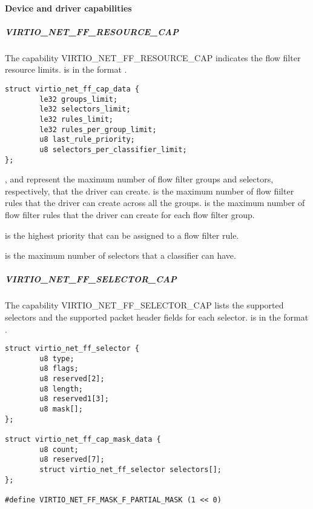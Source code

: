 \paragraph{Device and driver capabilities}
\label{par:Device Types / Network Device / Device Operation / Flow filter / Device and driver capabilities}

\subparagraph{VIRTIO_NET_FF_RESOURCE_CAP}
\label{par:Device Types / Network Device / Device Operation / Flow filter / Device and driver capabilities / VIRTIO-NET-FF-RESOURCE-CAP}

The capability VIRTIO_NET_FF_RESOURCE_CAP indicates the flow filter resource limits.
 is in the format
.

\begin{lstlisting}
struct virtio_net_ff_cap_data {
        le32 groups_limit;
        le32 selectors_limit;
        le32 rules_limit;
        le32 rules_per_group_limit;
        u8 last_rule_priority;
        u8 selectors_per_classifier_limit;
};
\end{lstlisting}

, and  represent the maximum
number of flow filter groups and selectors, respectively, that the driver can create.
  is the maximum number of
flow fiilter rules that the driver can create across all the groups.
 is the maximum number of flow filter rules that the driver
can create for each flow filter group.

 is the highest priority that can be assigned to a
flow filter rule.

 is the maximum number of selectors
that a classifier can have.

\subparagraph{VIRTIO_NET_FF_SELECTOR_CAP}
\label{par:Device Types / Network Device / Device Operation / Flow filter / Device and driver capabilities / VIRTIO-NET-FF-SELECTOR-CAP}

The capability VIRTIO_NET_FF_SELECTOR_CAP lists the supported selectors and the
supported packet header fields for each selector.
 is in the format .

\begin{lstlisting}[label={lst:Device Types / Network Device / Device Operation / Flow filter / Device and driver capabilities / VIRTIO-NET-FF-SELECTOR-CAP / virtio-net-ff-selector}]
struct virtio_net_ff_selector {
        u8 type;
        u8 flags;
        u8 reserved[2];
        u8 length;
        u8 reserved1[3];
        u8 mask[];
};

struct virtio_net_ff_cap_mask_data {
        u8 count;
        u8 reserved[7];
        struct virtio_net_ff_selector selectors[];
};

#define VIRTIO_NET_FF_MASK_F_PARTIAL_MASK (1 << 0)
\end{lstlisting}

